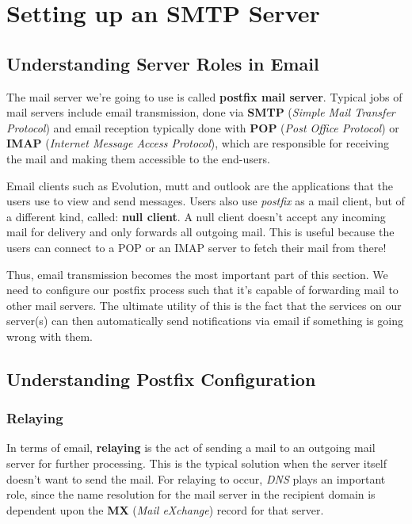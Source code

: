 \chapter{Setting up an SMTP Server}

\section{Understanding Server Roles in Email}
The mail server we're going to use is called \textbf{postfix mail server}. Typical jobs of mail servers include email transmission, done via \textbf{SMTP} (\textit{Simple Mail Transfer Protocol}) and email reception typically done with \textbf{POP} (\textit{Post Office Protocol}) or \textbf{IMAP} (\textit{Internet Message Access Protocol}), which are responsible for receiving the mail and making them accessible to the end-users. 

Email clients such as Evolution, mutt and outlook are the applications that the users use to view and send messages. Users also use \textit{postfix} as a mail client, but of a different kind, called: \textbf{null client}. A null client doesn't accept any incoming mail for delivery and only forwards all outgoing mail. This is useful because the users can connect to a POP or an IMAP server to fetch their mail from there! 

Thus, email transmission becomes the most important part of this section. We need to configure our postfix process such that it's capable of forwarding mail to other mail servers. The ultimate utility of this is the fact that the services on our server(s) can then automatically send notifications via email if something is going wrong with them. 

\section{Understanding Postfix Configuration}
\subsection{Relaying}
\vspace{-10pt}
In terms of email, \textbf{relaying} is the act of sending a mail to an outgoing mail server for further processing. This is the typical solution when the server itself doesn't want to send the mail. For relaying to occur, \textit{DNS} plays an important role, since the name resolution for the mail server in the recipient domain is dependent upon the \textbf{MX} (\textit{Mail eXchange}) record for that server. 

